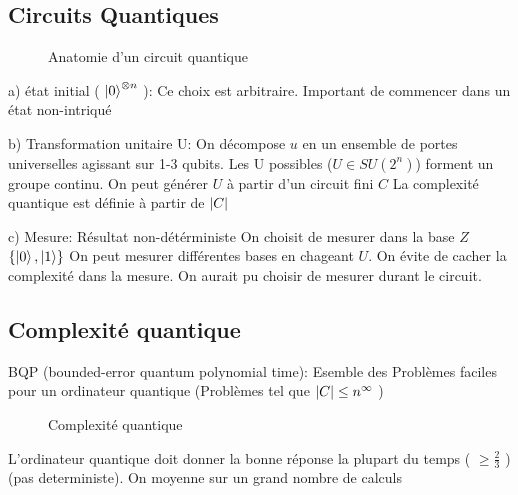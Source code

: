 \subsection{Circuits Quantiques}

\begin{figure}[ht]
    \centering
    \caption{Anatomie d'un circuit quantique}
    \label{fig:anatomie-d'un-circuit-quantique}
\end{figure}

a) état initial ( $\ket{0}^{ \otimes n }$  ): Ce choix est arbitraire. Important de commencer dans un état non-intriqué


b) Transformation unitaire U: On décompose $u$ en un ensemble de portes universelles agissant sur 1-3 qubits.
Les U possibles ($U\in SU(2^n)$) forment un groupe continu. On peut générer $U$ à partir d'un circuit fini $C$  
La complexité quantique est définie à partir de $\abs{C} $ 


c) Mesure:
Résultat non-détérministe
On choisit de mesurer dans la base $Z$ $\{ \ket{0}, \ket{1} \}$ 
On peut mesurer différentes bases en chageant $U$. On évite de cacher la complexité dans la mesure. On aurait pu choisir de mesurer durant le circuit.  


\subsection{Complexité quantique}


BQP (bounded-error quantum polynomial time): Esemble des Problèmes faciles pour un ordinateur quantique
(Problèmes tel que $\abs{C} \leq n^\infty $ ) 


\begin{figure}[ht]
    \centering
    \caption{Complexité quantique}
    \label{fig:complexité-quantique}
\end{figure}


L'ordinateur quantique doit donner la bonne réponse la plupart du temps ( $\geq \frac{2}{3} $  ) (pas deterministe). On moyenne sur un grand nombre de calculs


